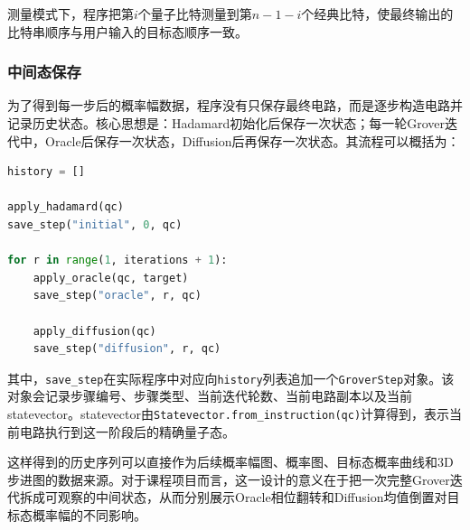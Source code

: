 测量模式下，程序把第\(i\)个量子比特测量到第\(n-1-i\)个经典比特，使最终输出的比特串顺序与用户输入的目标态顺序一致。

\subsubsection{中间态保存}

为了得到每一步后的概率幅数据，程序没有只保存最终电路，而是逐步构造电路并记录历史状态。核心思想是：Hadamard初始化后保存一次状态；每一轮Grover迭代中，Oracle后保存一次状态，Diffusion后再保存一次状态。其流程可以概括为：

\begin{lstlisting}[language=Python]
history = []

apply_hadamard(qc)
save_step("initial", 0, qc)

for r in range(1, iterations + 1):
    apply_oracle(qc, target)
    save_step("oracle", r, qc)

    apply_diffusion(qc)
    save_step("diffusion", r, qc)
\end{lstlisting}

其中，\texttt{save\_step}在实际程序中对应向\texttt{history}列表追加一个\texttt{GroverStep}对象。该对象会记录步骤编号、步骤类型、当前迭代轮数、当前电路副本以及当前statevector。statevector由\texttt{Statevector.from\_instruction(qc)}计算得到，表示当前电路执行到这一阶段后的精确量子态。

这样得到的历史序列可以直接作为后续概率幅图、概率图、目标态概率曲线和3D步进图的数据来源。对于课程项目而言，这一设计的意义在于把一次完整Grover迭代拆成可观察的中间状态，从而分别展示Oracle相位翻转和Diffusion均值倒置对目标态概率幅的不同影响。
